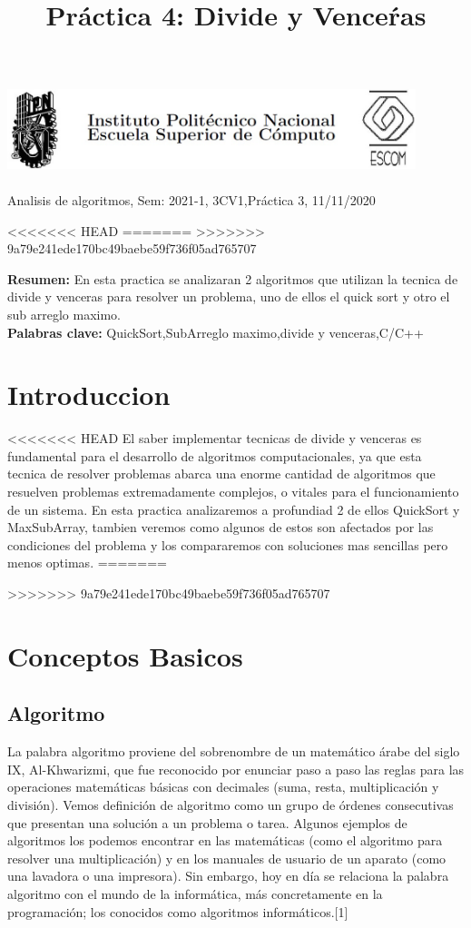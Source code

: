 \documentclass[spanish]{article}
\title {Práctica 4: Divide y Venceŕas}
\begin{document}
	\centerline{\includegraphics[width=450px,height=100px]{header}}
	\centerline{Analisis de algoritmos, Sem: 2021-1, 3CV1,Práctica  3, 11/11/2020}
<<<<<<< HEAD
=======
>>>>>>> 9a79e241ede170bc49baebe59f736f05ad765707
	\centerline{}
	\bigskip
	\justify
	\textbf{Resumen:}	
	En esta practica se analizaran 2 algoritmos que utilizan la tecnica de divide y venceras para resolver un problema, uno de ellos el quick sort y otro el sub arreglo maximo.\\
	\textbf{Palabras clave:}
	QuickSort,SubArreglo maximo,divide y venceras,C/C++
	\section{Introduccion}
<<<<<<< HEAD
	El saber implementar tecnicas de divide y venceras es fundamental para el desarrollo de algoritmos computacionales, ya que esta tecnica de resolver problemas abarca una enorme cantidad de algoritmos que resuelven problemas extremadamente complejos, o vitales para el funcionamiento de un sistema. En esta practica analizaremos a profundiad 2 de ellos QuickSort y MaxSubArray, tambien veremos como algunos de estos son afectados por las condiciones del problema y los compararemos con soluciones mas sencillas pero menos optimas.
=======
	
>>>>>>> 9a79e241ede170bc49baebe59f736f05ad765707
	\section{Conceptos Basicos}
	\subsection{Algoritmo}
	La palabra algoritmo proviene del sobrenombre de un matemático árabe del siglo IX, Al-Khwarizmi, que fue reconocido por enunciar paso a paso las reglas para las operaciones matemáticas básicas con decimales (suma, resta, multiplicación y división).	
	Vemos definición de algoritmo como un grupo de órdenes consecutivas que presentan una solución a un problema o tarea. Algunos ejemplos de algoritmos los podemos encontrar en las matemáticas (como el algoritmo para resolver una multiplicación) y en los manuales de usuario de un aparato (como una lavadora o una impresora).	
	Sin embargo, hoy en día se relaciona la palabra algoritmo con el mundo de la informática, más concretamente en la programación; los conocidos como algoritmos informáticos.[1]
\end{document}
